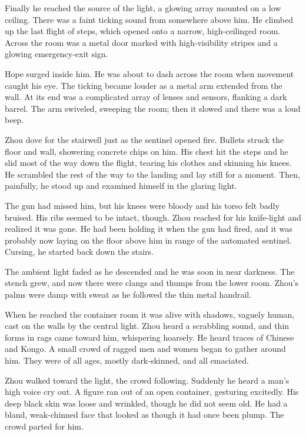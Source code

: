 \documentclass[10pt,a4paper]{article}
\begin{document}
Finally he reached the source of the light, a glowing array
mounted on a low ceiling. There was a faint ticking sound from
somewhere above him. He climbed up the last flight of steps,
which opened onto a narrow, high-ceilinged room. Across the room
was a metal door marked with high-visibility stripes and a glowing
emergency-exit sign.

Hope surged inside him. He was about to dash across the room when
movement caught his eye. The ticking became louder as a metal
arm extended from the wall. At its end was a complicated array
of lenses and sensors, flanking a dark barrel. The arm swiveled,
sweeping the room; then it slowed and there was a loud beep.

Zhou dove for the stairwell just as the sentinel opened fire. Bullets
struck the floor and wall, showering concrete chips on him. His
chest hit the steps and he slid most of the way down the flight,
tearing his clothes and skinning his knees. He scrambled the rest of
the way to the landing and lay still for a moment. Then, painfully,
he stood up and examined himself in the glaring light.

The gun had missed him, but his knees were bloody and his torso
felt badly bruised. His ribs seemed to be intact, though. Zhou
reached for his knife-light and realized it was gone. He had been
holding it when the gun had fired, and it was probably now laying
on the floor above him in range of the automated sentinel. Cursing,
he started back down the stairs.

The ambient light faded as he descended and he was soon in near
darkness. The stench grew, and now there were clangs and thumps from
the lower room. Zhou's palms were damp with sweat as he followed
the thin metal handrail.

When he reached the container room it was alive with shadows,
vaguely human, cast on the walls by the central light. Zhou heard a
scrabbling sound, and thin forms in rags came toward him, whispering
hoarsely. He heard traces of Chinese and Kongo. A small crowd of
ragged men and women began to gather around him. They were of all
ages, mostly dark-skinned, and all emaciated.

Zhou walked toward the light, the crowd following. Suddenly he heard
a man's high voice cry out. A figure ran out of an open container,
gesturing excitedly. His deep black skin was loose and wrinkled,
though he did not seem old. He had a bland, weak-chinned face that
looked as though it had once been plump. The crowd parted for him.
\end{document}
